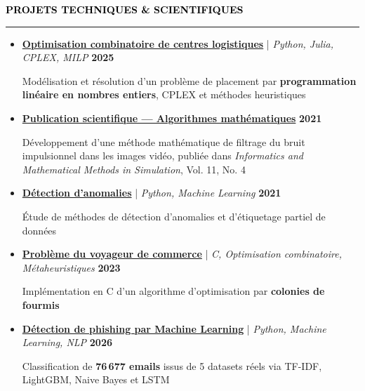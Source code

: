 \documentclass[10pt,english,french]{article}
\newcommand{\itProjectIcon}[1][black]{\textcolor{#1}{\faLaptopCode}}
\newcommand{\cvsection}[1]{
    \vspace{4pt}
    \textbf{\fontsize{9pt}{10pt}\selectfont \textcolor{black}{#1}}
    \vspace{6pt}
    \hrule
    \vspace{6pt}
}
\begin{document}
\vspace{-4pt}
\vspace{-4pt}
\cvsection{\itProjectIcon[black]\hspace{4pt}PROJETS TECHNIQUES \& SCIENTIFIQUES}

\vspace{-7pt}
\begin{itemize}[leftmargin=0.5cm, label=\textbullet, itemsep=0.12em]
    \item \href{https://github.com/DmytroPalahin/logistics-center-placement}
          {\textbf{Optimisation combinatoire de centres logistiques}} |
          \textit{Python, Julia, CPLEX, MILP} \hfill \textbf{2025}

          Modélisation et résolution d'un problème de placement par
          \textbf{programmation linéaire en nombres entiers}, CPLEX et méthodes heuristiques

    \item \href{https://www.researchsquare.com/article/rs-2203260/v1}
          {\textbf{Publication scientifique --- Algorithmes mathématiques}} \hfill \textbf{2021}

          Développement d'une méthode mathématique de filtrage du bruit impulsionnel dans les images vidéo,
          publiée dans \textit{Informatics and Mathematical Methods in Simulation}, Vol. 11, No. 4

    \item \href{https://github.com/DmytroPalahin/Anomaly_Detection}
          {\textbf{Détection d'anomalies}} | \textit{Python, Machine Learning} \hfill \textbf{2021}

          Étude de méthodes de détection d'anomalies et d'étiquetage partiel de données

    \item \href{https://github.com/DmytroPalahin/Probleme_du_Voyageur_de_Commerce}
          {\textbf{Problème du voyageur de commerce}} |
          \textit{C, Optimisation combinatoire, Métaheuristiques} \hfill \textbf{2023}

          Implémentation en C d'un algorithme d'optimisation par \textbf{colonies de fourmis}

    \item \href{https://github.com/DmytroPalahin/phishing-email-detection}
          {\textbf{Détection de phishing par Machine Learning}} |
          \textit{Python, Machine Learning, NLP} \hfill \textbf{2026}

          Classification de \textbf{76\,677 emails} issus de 5 datasets réels via
          TF-IDF, LightGBM, Naive Bayes et LSTM
\end{itemize}
\end{document}
